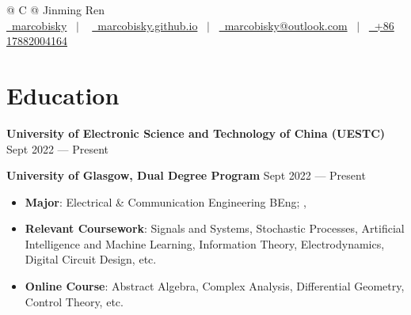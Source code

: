 \documentclass[a4paper,11pt]{article}
\newcommand{\MYhref}[3][black]{\href{#2}{\color{#1}{#3}}}%
\begin{document}
\pagestyle{empty} 



\begin{tabularx}{\linewidth}{@{} C @{}}
\Huge{Jinming Ren} \\[7.5pt]
\href{https://github.com/marcobisky}{\raisebox{-0.05\height}\faGithub\ marcobisky} \ $|$ \ 
\href{https://marcobisky.github.io}{\raisebox{-0.05\height}\faGlobe \ marcobisky.github.io} \ $|$ \ 
\href{mailto:marcobisky@outlook.com}{\raisebox{-0.05\height}\faEnvelope \ marcobisky@outlook.com} \ $|$ \ 
\href{tel:+86 17882004164}{\raisebox{-0.05\height}\faMobile \ +86 17882004164} \\
\end{tabularx}


\section{Education}


\textbf{University of Electronic Science and Technology of China (UESTC)}  \hfill Sept 2022 --- Present

\textbf{University of Glasgow, Dual Degree Program} \hfill Sept 2022 --- Present

\begin{itemize}
    \setlength\itemsep{-0.5em}
    \item \textbf{Major}: Electrical \& Communication Engineering BEng; \MYhref{https://marcobisky.moe/cv/score.pdf}{GPA: 3.87/4.0}, \MYhref{https://marcobisky.moe/cv/rank.pdf}{Ranking: 2/164 (Top 1.2\%).} 
    \item \textbf{Relevant Coursework}: Signals and Systems, Stochastic Processes, Artificial Intelligence and Machine Learning, Information Theory, Electrodynamics, Digital Circuit Design, etc.
    \item \textbf{Online Course}: Abstract Algebra, Complex Analysis, Differential Geometry, Control Theory, etc.
\end{itemize}
\end{document}
